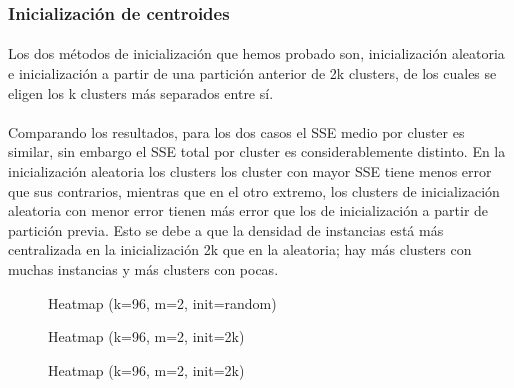 \documentclass[10pt,a4paper]{article}
\begin{document}
	\subsubsection{Inicialización de centroides}
	\paragraph{}
	Los dos métodos de inicialización que hemos probado son, inicialización aleatoria e inicialización a partir de una partición anterior de 2k clusters, de los cuales se eligen los k clusters más separados entre sí.
	\paragraph{}
	Comparando los resultados, para los dos casos el SSE medio por cluster es similar, sin embargo el SSE total por cluster es considerablemente distinto. En la inicialización aleatoria los clusters los cluster con mayor SSE tiene menos error que sus contrarios, mientras que en el otro extremo, los clusters de inicialización aleatoria con menor error tienen más error que los de inicialización a partir de partición previa. Esto se debe a que la densidad de instancias está más centralizada en la inicialización 2k que en la aleatoria; hay más clusters con muchas instancias y más clusters con pocas.
	\begin{figure}
		\centering
		\caption{Heatmap (k=96, m=2, init=random)}
		\label{fig:sse_96_2_random}
	\end{figure}
	\begin{figure}
		\centering
		\caption{Heatmap (k=96, m=2, init=2k)}
		\label{fig:sse_96_2_2k}
	\end{figure}
	\begin{figure}
		\centering
		\caption{Heatmap (k=96, m=2, init=2k)}
		\label{fig:htm_96_2_2k}
	\end{figure}
\end{document}
